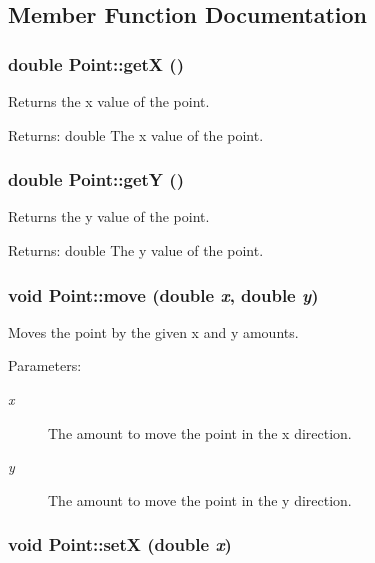 \subsection{Member Function Documentation}
\hypertarget{class_point_8de35a6098cdd7267b4167776da83da6}{
\subsubsection[{getX}]{\setlength{\rightskip}{0pt plus 5cm}double Point::getX ()}}
\label{class_point_8de35a6098cdd7267b4167776da83da6}


Returns the x value of the point. 

\begin{Desc}
\item[Returns:]double The x value of the point. \end{Desc}
\hypertarget{class_point_a278c8bcb8aeb4101023a4baf473b547}{
\subsubsection[{getY}]{\setlength{\rightskip}{0pt plus 5cm}double Point::getY ()}}
\label{class_point_a278c8bcb8aeb4101023a4baf473b547}


Returns the y value of the point. 

\begin{Desc}
\item[Returns:]double The y value of the point. \end{Desc}
\hypertarget{class_point_84f2eee352c9d26963bca63a03eb7676}{
\subsubsection[{move}]{\setlength{\rightskip}{0pt plus 5cm}void Point::move (double {\em x}, \/  double {\em y})}}
\label{class_point_84f2eee352c9d26963bca63a03eb7676}


Moves the point by the given x and y amounts. 

\begin{Desc}
\item[Parameters:]
\begin{description}
\item[{\em x}]The amount to move the point in the x direction. \item[{\em y}]The amount to move the point in the y direction. \end{description}
\end{Desc}
\hypertarget{class_point_9aa66c310860d038cb1258dc5cd80906}{
\subsubsection[{setX}]{\setlength{\rightskip}{0pt plus 5cm}void Point::setX (double {\em x})}}
\label{class_point_9aa66c310860d038cb1258dc5cd80906}


